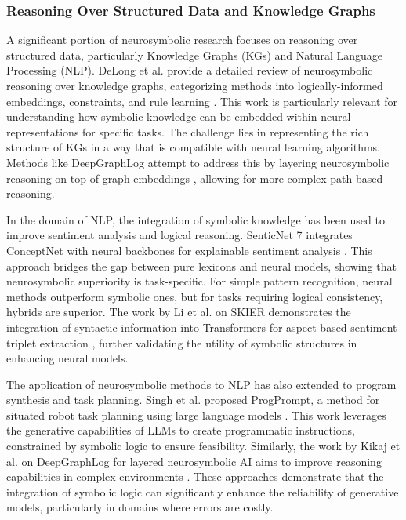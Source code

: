 \documentclass{article}
\begin{document}
\subsubsection{Reasoning Over Structured Data and Knowledge Graphs}

\label{sec:reasoning_over_structured_data_and_knowl}

A significant portion of neurosymbolic research focuses on reasoning over structured data, particularly Knowledge Graphs (KGs) and Natural Language Processing (NLP). DeLong et al. provide a detailed review of neurosymbolic reasoning over knowledge graphs, categorizing methods into logically-informed embeddings, constraints, and rule learning \cite{delong2023neurosymbolic}. This work is particularly relevant for understanding how symbolic knowledge can be embedded within neural representations for specific tasks. The challenge lies in representing the rich structure of KGs in a way that is compatible with neural learning algorithms. Methods like DeepGraphLog attempt to address this by layering neurosymbolic reasoning on top of graph embeddings \cite{kikaj2025deepgraphlog}, allowing for more complex path-based reasoning.

In the domain of NLP, the integration of symbolic knowledge has been used to improve sentiment analysis and logical reasoning. SenticNet 7 integrates ConceptNet with neural backbones for explainable sentiment analysis \cite{cambria2022senticnet}. This approach bridges the gap between pure lexicons and neural models, showing that neurosymbolic superiority is task-specific. For simple pattern recognition, neural methods outperform symbolic ones, but for tasks requiring logical consistency, hybrids are superior. The work by Li et al. on SKIER demonstrates the integration of syntactic information into Transformers for aspect-based sentiment triplet extraction \cite{li2023skier}, further validating the utility of symbolic structures in enhancing neural models.

The application of neurosymbolic methods to NLP has also extended to program synthesis and task planning. Singh et al. proposed ProgPrompt, a method for situated robot task planning using large language models \cite{singh2023progprompt}. This work leverages the generative capabilities of LLMs to create programmatic instructions, constrained by symbolic logic to ensure feasibility. Similarly, the work by Kikaj et al. on DeepGraphLog for layered neurosymbolic AI aims to improve reasoning capabilities in complex environments \cite{kikaj2025deepgraphlog}. These approaches demonstrate that the integration of symbolic logic can significantly enhance the reliability of generative models, particularly in domains where errors are costly.
\end{document}
